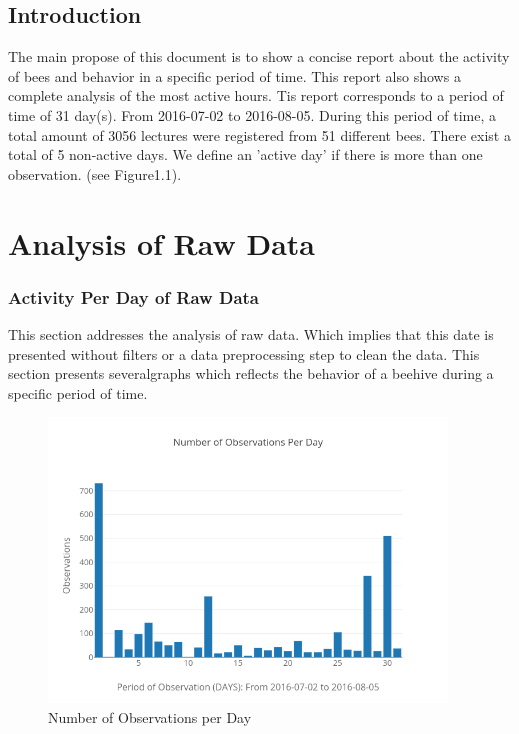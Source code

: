 \documentclass[11pt,fleqn]{book} %
\begin{document}
\section{Introduction}%
\label{sec:Introduction}%
The main propose of this document  is to show a concise report about the activity of bees and behavior in a specific period of time. This report also shows a complete analysis of the most active hours.\newline%
\newline%
Tis report corresponds to a period of time of 31 day(s). From 2016{-}07{-}02 to 2016{-}08{-}05. During this period of time, a total amount of 3056 lectures were registered from 51 different bees. There exist a total of 5 non{-}active days. We define an 'active day' if there is more than one observation. (see Figure1.1).\newline%
\newline%

\chapter{Analysis of Raw Data} 
\normalsize%
\subsection{Activity Per Day of Raw Data}%
\label{subsec:Activity Per Day of Raw Data}%
This section addresses the analysis of raw data. Which implies that this date is presented without filters or a data preprocessing step to clean the data. This section presents severalgraphs which reflects the behavior of a beehive during a specific period of time.%


\begin{figure}[h!]%
\centering%
\includegraphics[width=400px]{Pictures/plots/good/Morelia Hive 1observationsPerdayUnclean.png}%
\caption{Number of Observations per Day}%
\end{figure}
\end{document}
